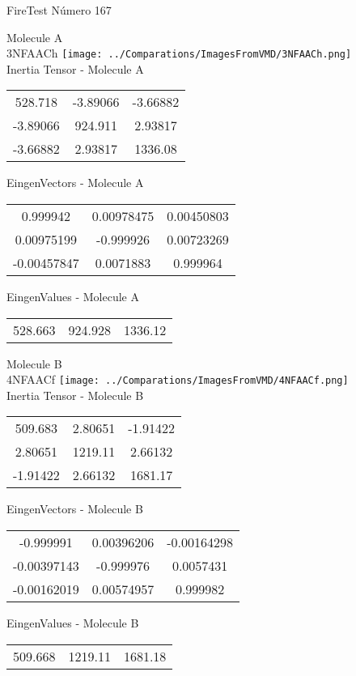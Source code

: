 \vtab[-2cm]
\begin{center}
{\large FireTest \tab Número 167}
\end{center}
\begin{multicols}{2}
\begin{center}

Molecule A \\ 
3NFAACh
\texttt{[image: ../Comparations/ImagesFromVMD/3NFAACh.png]}
\\
Inertia Tensor - Molecule A \\
\vtab

\begin{tabular}{|c c c|}
528.718	 & 	-3.89066	 & 	-3.66882	 \\
-3.89066	 & 	924.911	 & 	2.93817	 \\
-3.66882	 & 	2.93817	 & 	1336.08
\end{tabular}

\vtab
 EingenVectors - Molecule A     \\
\vtab
\begin{tabular}{|c c c|}
0.999942	 & 	0.00978475	 & 	0.00450803	 \\
0.00975199	 & 	-0.999926	 & 	0.00723269	 \\
-0.00457847	 & 	0.0071883	 & 	0.999964
\end{tabular}

\vtab
 EingenValues - Molecule A     \\
\vtab
\begin{tabular}{|c c c|}
528.663	 & 	924.928	 & 	1336.12	 \\
\end{tabular}
\columnbreak

Molecule B \\ 
4NFAACf
\texttt{[image: ../Comparations/ImagesFromVMD/4NFAACf.png]}
\\
Inertia Tensor - Molecule B \\
\vtab

\begin{tabular}{|c c c|}
509.683	 & 	2.80651	 & 	-1.91422	 \\
2.80651	 & 	1219.11	 & 	2.66132	 \\
-1.91422	 & 	2.66132	 & 	1681.17
\end{tabular}

\vtab
 EingenVectors - Molecule B     \\
\vtab
\begin{tabular}{|c c c|}
-0.999991	 & 	0.00396206	 & 	-0.00164298	 \\
-0.00397143	 & 	-0.999976	 & 	0.0057431	 \\
-0.00162019	 & 	0.00574957	 & 	0.999982
\end{tabular}

\vtab
 EingenValues - Molecule B     \\
\vtab
\begin{tabular}{|c c c|}
509.668	 & 	1219.11	 & 	1681.18	 \\
\end{tabular}

\end{center}
\end{multicols}
